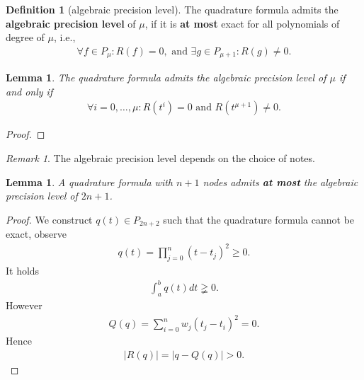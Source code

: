 \documentclass[a4paper,12pt,oneside,fleqn]{book}
\newtheorem{lemma}[theorem]{Lemma}
\theoremstyle{definition}
\newtheorem{definition}{Definition}[section]
\theoremstyle{remark}
\newtheorem*{remark}{Remark}
\begin{document}
\begin{definition}[algebraic precision level]
	The quadrature formula admits the \textbf{algebraic precision level} of $\mu$, if it is \textbf{at most} exact for all polynomials of degree of $\mu$, i.e., 
	\begin{align*}
		\forall f \in P_\mu: R(f) = 0, \text{ and }
		\exists g \in P_{\mu + 1}: R(g) \neq 0. 
	\end{align*}
\end{definition}

\begin{lemma}
	The quadrature formula admits the algebraic precision level of $\mu$ if and only if 
	\begin{align*}
		\forall i = 0, \dots, \mu: R(t^i) = 0 
		\text{ and }
		R(t^{\mu + 1}) \neq 0. 
	\end{align*}
\end{lemma}
\begin{proof}
\end{proof}

\begin{remark}
The algebraic precision level depends on the choice of notes. 	
\end{remark}

\begin{lemma}
	A quadrature formula with $n + 1$ nodes admits \textbf{at most} the algebraic precision level of $2n + 1$. 
\end{lemma}
\begin{proof}
	We construct $q(t) \in P_{2n +2}$ such that the quadrature formula cannot be exact, observe
	\begin{align*}
		q(t) = \prod_{j = 0}^n(t - t_j)^2 \ge 0.
	\end{align*}
	It holds
	\begin{align*}
		\int_a^b q	(t)dt \gneqq 0. 
	\end{align*}
	However
	\begin{align*}
		Q(q) = \sum_{i = 0}^n w_j (t_j - t_i)^2 = 0.
	\end{align*}
	Hence
	\begin{align*}
		|R(q)| = |q - Q(q)| > 0. 
	\end{align*}
\end{proof}
\end{document}
